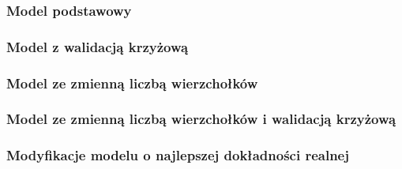 
\subsubsection{Model podstawowy}


\subsubsection{Model z walidacją krzyżową}


\subsubsection{Model ze zmienną liczbą wierzchołków}


\subsubsection{Model ze zmienną liczbą wierzchołków i walidacją krzyżową}


\subsubsection{Modyfikacje modelu o najlepszej dokładności realnej}
